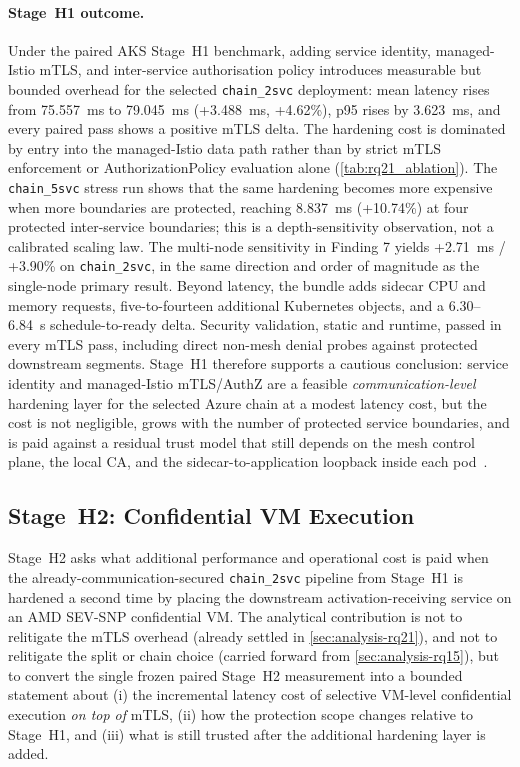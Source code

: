\paragraph{Stage~H1 outcome.}
Under the paired AKS Stage~H1 benchmark, adding service identity,
managed-Istio mTLS, and inter-service authorisation policy introduces
measurable but bounded overhead for the selected \texttt{chain\_2svc}
deployment: mean latency rises from 75.557~ms to 79.045~ms (+3.488~ms,
+4.62\%), p95 rises by 3.623~ms, and every paired pass shows a positive
mTLS delta. The hardening cost is dominated by entry into the managed-Istio
data path rather than by strict mTLS enforcement or AuthorizationPolicy
evaluation alone (\cref{tab:rq21_ablation}). The \texttt{chain\_5svc}
stress run shows that the same hardening becomes more expensive when more
boundaries are protected, reaching 8.837~ms (+10.74\%) at four protected
inter-service boundaries; this is a depth-sensitivity observation, not a
calibrated scaling law. The multi-node sensitivity in Finding 7 yields
+2.71~ms / +3.90\% on \texttt{chain\_2svc}, in the same direction and
order of magnitude as the single-node primary result. Beyond latency, the
bundle adds sidecar CPU and memory requests, five-to-fourteen additional
Kubernetes objects, and a 6.30--6.84~s schedule-to-ready delta. Security
validation, static and runtime, passed in every mTLS pass, including direct
non-mesh denial probes against protected downstream segments. Stage~H1
therefore supports a cautious conclusion: service identity and
managed-Istio mTLS/AuthZ are a feasible \emph{communication-level}
hardening layer for the selected Azure chain at a modest latency cost, but
the cost is not negligible, grows with the number of protected service
boundaries, and is paid against a residual trust model that still depends
on the mesh control plane, the local CA, and the sidecar-to-application
loopback inside each pod~\cite{poudel2025mazu}.

\subsection{Stage~H2: Confidential VM Execution}
\label{sec:analysis-rq22}

Stage~H2 asks what additional performance and operational cost is paid when the
already-communication-secured \texttt{chain\_2svc} pipeline from Stage~H1 is
hardened a second time by placing the downstream activation-receiving
service on an AMD SEV-SNP confidential VM. The analytical contribution is
not to relitigate the mTLS overhead (already settled in
\cref{sec:analysis-rq21}), and not to relitigate the split or chain choice
(carried forward from \cref{sec:analysis-rq15}), but to convert the single
frozen paired Stage~H2 measurement into a bounded statement about (i) the
incremental latency cost of selective VM-level confidential execution
\emph{on top of} mTLS, (ii) how the protection scope changes relative to
Stage~H1, and (iii) what is still trusted after the additional hardening
layer is added.

